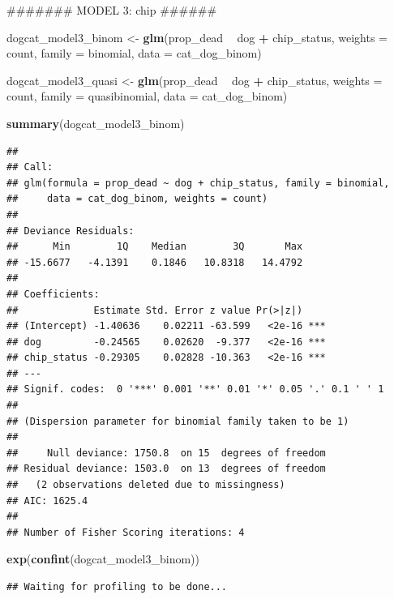 \documentclass[]{article}
\newenvironment{Shaded}{\begin{snugshade}}{\end{snugshade}}
\newcommand{\KeywordTok}[1]{\textcolor[rgb]{0.13,0.29,0.53}{\textbf{#1}}}
\newcommand{\DataTypeTok}[1]{\textcolor[rgb]{0.13,0.29,0.53}{#1}}
\newcommand{\StringTok}[1]{\textcolor[rgb]{0.31,0.60,0.02}{#1}}
\newcommand{\OperatorTok}[1]{\textcolor[rgb]{0.81,0.36,0.00}{\textbf{#1}}}
\newcommand{\NormalTok}[1]{#1}
\begin{document}
\begin{Shaded}
\begin{Highlighting}[]
\NormalTok{####### MODEL 3: chip ######}

\NormalTok{dogcat_model3_binom <-}\StringTok{ }\KeywordTok{glm}\NormalTok{(prop_dead }\OperatorTok{~}\StringTok{ }\NormalTok{dog }\OperatorTok{+}\StringTok{ }\NormalTok{chip_status, }\DataTypeTok{weights =}\NormalTok{ count, }\DataTypeTok{family =}\NormalTok{ binomial, }\DataTypeTok{data =}\NormalTok{ cat_dog_binom)}

\NormalTok{dogcat_model3_quasi <-}\StringTok{ }\KeywordTok{glm}\NormalTok{(prop_dead }\OperatorTok{~}\StringTok{ }\NormalTok{dog }\OperatorTok{+}\StringTok{ }\NormalTok{chip_status, }\DataTypeTok{weights =}\NormalTok{ count, }\DataTypeTok{family =}\NormalTok{ quasibinomial, }\DataTypeTok{data =}\NormalTok{ cat_dog_binom)}

\KeywordTok{summary}\NormalTok{(dogcat_model3_binom)}
\end{Highlighting}
\end{Shaded}

\begin{verbatim}
## 
## Call:
## glm(formula = prop_dead ~ dog + chip_status, family = binomial, 
##     data = cat_dog_binom, weights = count)
## 
## Deviance Residuals: 
##      Min        1Q    Median        3Q       Max  
## -15.6677   -4.1391    0.1846   10.8318   14.4792  
## 
## Coefficients:
##             Estimate Std. Error z value Pr(>|z|)    
## (Intercept) -1.40636    0.02211 -63.599   <2e-16 ***
## dog         -0.24565    0.02620  -9.377   <2e-16 ***
## chip_status -0.29305    0.02828 -10.363   <2e-16 ***
## ---
## Signif. codes:  0 '***' 0.001 '**' 0.01 '*' 0.05 '.' 0.1 ' ' 1
## 
## (Dispersion parameter for binomial family taken to be 1)
## 
##     Null deviance: 1750.8  on 15  degrees of freedom
## Residual deviance: 1503.0  on 13  degrees of freedom
##   (2 observations deleted due to missingness)
## AIC: 1625.4
## 
## Number of Fisher Scoring iterations: 4
\end{verbatim}

\begin{Shaded}
\begin{Highlighting}[]
\KeywordTok{exp}\NormalTok{(}\KeywordTok{confint}\NormalTok{(dogcat_model3_binom))}
\end{Highlighting}
\end{Shaded}

\begin{verbatim}
## Waiting for profiling to be done...
\end{verbatim}
\end{document}
